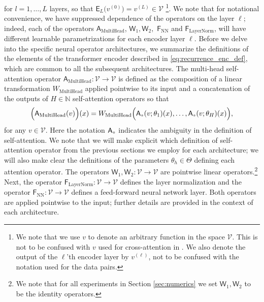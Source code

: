 \documentclass[twoside]{article}
\newcommand{\1}{\mathbbm{1}}
\newcommand{\N}{\mathbbm{N}}
\newcommand{\cV}{\mathcal{V}}
\newcommand{\sA}{\mathsf{A}}
\newcommand{\sF}{\mathsf{F}}
\newcommand{\sE}{\mathsf{E}}
\newcommand{\sW}{\mathsf{W}}
\newcommand{\placeholder}{\mathord{\color{black!33}\bullet}}
\providecommand{\mathbbm}{\mathbb} %
\begin{document}
for $l=1, \dots, L$ layers, so that $\sE_L\bigl( v^{(0)} \bigr) = v^{(L)}\in  \cV$ \footnote{We note that we use $v$ to denote an arbitrary function in the space $\cV$. This is not to be confused with $v$ used for cross-attention in . We also denote the output of the $\ell$'th encoder layer by $v^{(\ell)}$, not to be confused with the notation used for the data pairs.}. We note that for notational convenience, we have suppressed dependence of the operators on the layer $\ell$; indeed, each of the operators $\sA_{\textrm{MultiHead}}$, $\sW_1,\sW_2,$ $\sF_{\textrm{NN}}$ and $\sF_{\textrm{LayerNorm}}$, will have different learnable parametrizations for each encoder layer $\ell$. Before we delve into the specific neural operator architectures, we summarize the definitions of the elements of the transformer encoder described in \eqref{eq:recurrence_enc_def}, which are common to all the subsequent architectures. The multi-head self-attention operator $\sA_{\textrm{MultiHead}}: \cV \to \cV $ is defined as the composition of a linear transformation $W_{\textrm{MultiHead}}$ applied pointwise to its input and a concatenation of the outputs of $H\in\N$ self-attention operators so that
\begin{equation}
\label{eq:multihead1}
    \Bigl(\sA_{\textrm{MultiHead}}(v)\Bigr)(x) = W_{\textrm{MultiHead}} \Bigl(\sA_{\placeholder}(v;\theta_1)(x),\ldots, \sA_{\placeholder}(v;\theta_H)(x)  \Bigr),
\end{equation}
for any $v\in \cV$. 
Here the notation $\sA_{\placeholder}$ indicates the ambiguity in the definition of self-attention. We note that we will make explicit which definition of self-attention operator from the previous sections we employ for each architecture; we will also make clear the definitions of the parameters $\theta_h\in \Theta$ defining each attention operator. The operators $\sW_1,\sW_2:\cV\to\cV$ are pointwise linear operators.\footnote{We note that for all experiments in Section \ref{sec:numerics} we set $\sW_1,\sW_2$ to be the identity operators.} Next, the operator $\sF_{\textrm{LayerNorm}}:\cV \to \cV$ defines the layer normalization and the operator $\sF_\textrm{NN}:\cV \to \cV$ defines a feed-forward neural network layer. Both operators are applied pointwise to the input; further details are provided in the context of each architecture.
\end{document}
